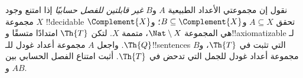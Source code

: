 \documentclass[../../../include/open-logic-section]{subfiles}
\begin{document}
\begin{prob}
نقول إن مجموعتي الأعداد الطبيعية $A$ و$B$ \emph{غير قابلتين للفصل
حسابيًا} إذا امتنع وجود مجموعة $X$ !!{decidable} تحقق
$A\subseteq X$ و$B\subseteq\Complement{X}$؛ و$\Complement{X}$
هي المجموعة $\Nat\setminus X$، متممة $X$.
لتكن $\Th{T}$ امتدادًا متسقًا و!!{axiomatizable} لـ$\Th{Q}$.
واجعل $A$ مجموعة أعداد غودل للـ!!{sentence}s التي تثبت في
$\Th{T}$، و$B$ مجموعة أعداد غودل للجمل التي تدحض في $\Th{T}$.
أثبت امتناع الفصل الحسابي بين $A$ و$B$.
\end{prob}
\end{document}
